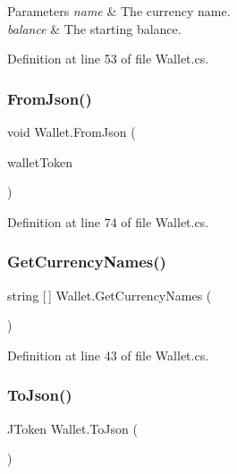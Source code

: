\begin{DoxyParams}{Parameters}
{\em name} & The currency name.\\
\hline
{\em balance} & The starting balance.\\
\hline
\end{DoxyParams}


Definition at line 53 of file Wallet.\+cs.

\mbox{\label{class_wallet_a43449073506217924f905adc90b5a2e8}} 
\subsubsection{\texorpdfstring{From\+Json()}{FromJson()}}
{\footnotesize\ttfamily void Wallet.\+From\+Json (\begin{DoxyParamCaption}\item[{J\+Token}]{wallet\+Token }\end{DoxyParamCaption})}



Definition at line 74 of file Wallet.\+cs.

\mbox{\label{class_wallet_a4512e9639bd8fb8803eb84acb44eab40}} 
\subsubsection{\texorpdfstring{Get\+Currency\+Names()}{GetCurrencyNames()}}
{\footnotesize\ttfamily string \mbox{[}$\,$\mbox{]} Wallet.\+Get\+Currency\+Names (\begin{DoxyParamCaption}{ }\end{DoxyParamCaption})}



Definition at line 43 of file Wallet.\+cs.

\mbox{\label{class_wallet_a55bfd77761cd69e935960ede23a71e2a}} 
\subsubsection{\texorpdfstring{To\+Json()}{ToJson()}}
{\footnotesize\ttfamily J\+Token Wallet.\+To\+Json (\begin{DoxyParamCaption}{ }\end{DoxyParamCaption})}



